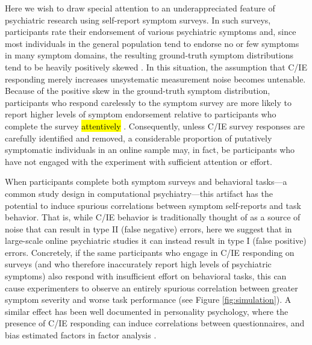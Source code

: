 \documentclass[a4paper,notitlepage,12pt]{article}
\begin{document}
\begin{refsection}[main]
Here we wish to draw special attention to an underappreciated feature of psychiatric research using self-report symptom surveys. In such surveys, participants rate their endorsement of various psychiatric symptoms and, since most individuals in the general population tend to endorse no or few symptoms in many symptom domains, the resulting ground-truth symptom distributions tend to be heavily positively skewed \cite{lowe2008validation, tomitaka2018distributional}. In this situation, the assumption that C/IE responding merely increases unsystematic measurement noise becomes untenable. Because of the positive skew in the ground-truth symptom distribution, participants who respond carelessly to the symptom survey are more likely to report higher levels of symptom endorsement relative to participants who complete the survey \hl{attentively} \cite{chandler2020participant, ophir2020turker, king2018random}. Consequently, unless C/IE survey responses are carefully identified and removed, a considerable proportion of putatively symptomatic individuals in an online sample may, in fact, be participants who have not engaged with the experiment with sufficient attention or effort.

When participants complete both symptom surveys and behavioral tasks---a common study design in computational psychiatry---this artifact has the potential to induce spurious correlations between symptom self-reports and task behavior. That is, while C/IE behavior is traditionally thought of as a source of noise that can result in type II (false negative) errors, here we suggest that in large-scale online psychiatric studies it can instead result in type I (false positive) errors. Concretely, if the same participants who engage in C/IE responding on surveys (and who therefore inaccurately report high levels of psychiatric symptoms) also respond with insufficient effort on behavioral tasks, this can cause experimenters to observe an entirely spurious correlation between greater symptom severity and worse task performance (see Figure \ref{fig:simulation}). A similar effect has been well documented in personality psychology, where the presence of C/IE responding can induce correlations between questionnaires, and bias estimated factors in factor analysis \cite{huang2012detecting, robinson2014inaccurate, huang2015insufficient, chandler2020participant, arias2020little}.


\end{refsection}
\end{document}
